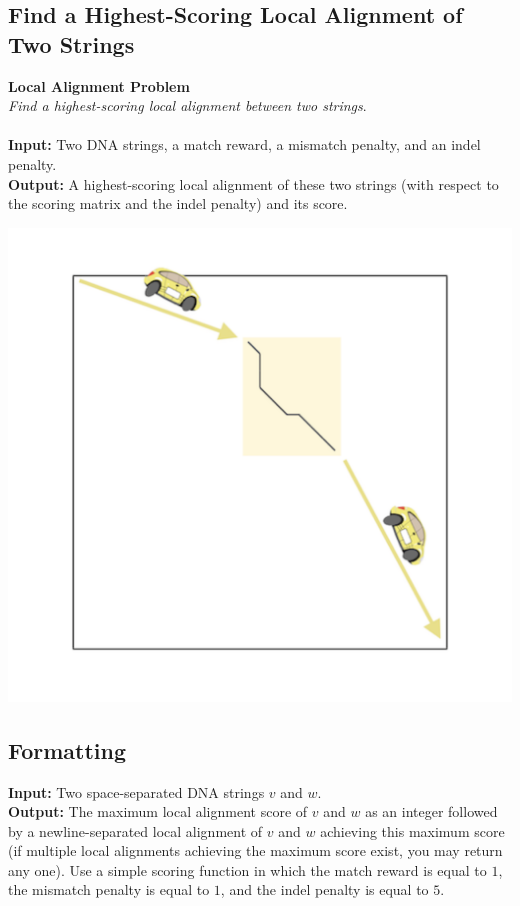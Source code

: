 \documentclass{article}
\begin{document}
\subsection{Find a Highest-Scoring Local Alignment of Two Strings}
\hline\vspace{5}
\textbf{Local Alignment Problem}\\
\emph{Find a highest-scoring local alignment between two strings}.\\ \\
\textbf{Input:} Two DNA strings, a match reward, a mismatch penalty, and an indel penalty.\\
\textbf{Output:} A highest-scoring local alignment of these two strings (with respect to the scoring matrix and the indel penalty) and its score.
\begin{center}
    \includegraphics[scale=0.18]{c5/logos/5F.png}
\end{center}
\hline\vspace{5}

\subsection*{Formatting}
\noindent\textbf{Input:} Two space-separated DNA strings $v$ and $w$.\\
\noindent\textbf{Output:} The maximum local alignment score of $v$ and $w$ as an integer followed by a newline-separated local alignment of $v$ and $w$ achieving this maximum score (if multiple local alignments achieving the maximum score exist, you may return any one). Use a simple scoring function in which the match reward is equal to $1$, the mismatch penalty is equal to $1$, and the indel penalty is equal to $5$.
\end{document}
